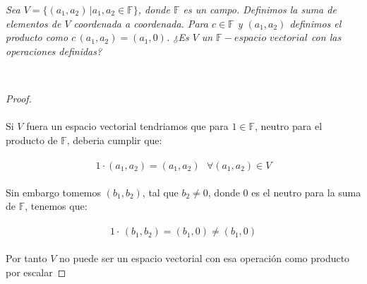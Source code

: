 \documentclass[11pt,letterpaper]{article}
\begin{document}
\begin{tcolorbox}[
	title = \textcolor{black}{\textcolor{white}{Problema 8}},]
\textit{Sea $V=\{(a_1,a_2)\,|a_1,a_2\in \mathbb{F}\}$, donde $\mathbb{F}$ es un campo. Definimos la suma de elementos de $V$ 
coordenada a coordenada. Para $c\in \mathbb{F}$ y $(a_1,a_2)$ definimos el producto como $c\,(a_1,a_2)=(a_1,0)$. ¿Es $V$
un $\mathbb{F}-espacio\,\,vectorial$ con las operaciones definidas?}
\end{tcolorbox}\,\\
\begin{proof}\,\\
	\,\\
	Si $V$ fuera un espacio vectorial tendriamos que para $1\in \mathbb{F}$, neutro para el producto de $\mathbb{F}$, deberia cumplir que:\,\\
	\,\\
	\begin{equation*}
		1\cdot(a_1,a_2)=(a_1,a_2)\,\,\,\,\forall (a_1,a_2)\in V
	\end{equation*}\,\\
	Sin embargo tomemos $(b_1,b_2)$, tal que $b_2\neq 0$, donde $0$ es el neutro para la suma de $\mathbb{F}$, tenemos que:\,\\
	\,\\
	\begin{equation*}
		1\cdot\,(b_1,b_2)=(b_1,0)\neq (b_1,0)
	\end{equation*}\,\\
	Por tanto $V$ no puede ser un espacio vectorial con esa operaci\'on como producto por escalar
    
\end{proof}\,\\
\end{document}
